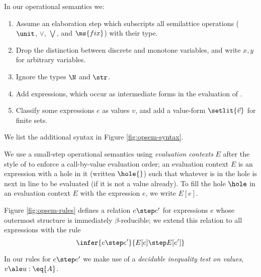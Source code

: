 In our operational semantics we:
\begin{enumerate}
\item Assume an elaboration step which subscripts all semilattice operations
  ($\unit$, $\vee$, $\bigvee$, and $\ms{fix}$) with their type.
\item Drop the distinction between discrete and monotone variables, and write
  $x,y$ for arbitrary variables.
\item Ignore the types $\N$ and $\str$. 
\item Add  expressions, which occur as intermediate forms in the
  evaluation of .
\item Classify some expressions $e$ as values $v$, and add a value-form
  $\setlit{\vec{v}}$ for finite sets.
\end{enumerate}
We list the additional syntax in Figure \ref{fig:opsem-syntax}.

We use a small-step operational semantics using \emph{evaluation contexts} $E$
after the style of \citet{reduction-contexts} to enforce a call-by-value
evaluation order; an evaluation context $E$ is an expression with a hole in it
(written $\hole{}$) such that whatever is in the hole is next in line to be
evaluated (if it is not a value already). To fill the hole $\hole$ in an
evaluation context $E$ with the expression $e$, we write $E[e]$.

Figure \ref{fig:opsem-rules} defines a relation $e \step e'$ for expressions $e$
whose outermost structure is immediately $\beta$-reducible; we extend this
relation to all expressions with the rule
\[\infer{e \step e'}{E[e] \step E[e']}\]

In our rules for $e \step e'$ we make use of a \emph{decidable inequality test
  on values}, $v \ale u : \eq{A}$.
